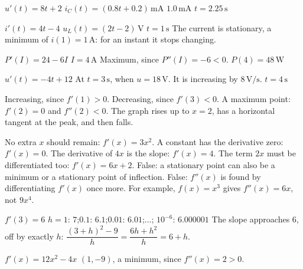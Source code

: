\begin{facit}
  $u'(t) = 8t + 2$  $i_C(t) = (0.8t + 0.2)\,\text{mA}$
 $1.0\,\text{mA}$  $t = 2.25\,\text{s}$

  $i'(t) = 4t - 4$  $u_L(t) = (2t - 2)\,\text{V}$  $t = 1\,\text{s}$
 The current is stationary, a minimum of $i(1) = 1\,\text{A}$: for an instant it stops
changing.

  $P'(I) = 24 - 6I$  $I = 4\,\text{A}$
 Maximum, since $P''(I) = -6 < 0$.  $P(4) = 48\,\text{W}$

  $u'(t) = -4t + 12$  At $t = 3\,\text{s}$, when $u = 18\,\text{V}$.
 It is increasing by $8\,\text{V/s}$.  $t = 4\,\text{s}$

  Increasing, since $f'(1) > 0$.  Decreasing, since $f'(3) < 0$.
 A maximum point: $f'(2) = 0$ and $f''(2) < 0$.
 The graph rises up to $x = 2$, has a horizontal tangent at the peak, and then falls.

  No extra $x$ should remain: $f'(x) = 3x^2$.
 A constant has the derivative zero: $f'(x) = 0$.
 The derivative of $4x$ is the slope: $f'(x) = 4$.
 The term $2x$ must be differentiated too: $f'(x) = 6x + 2$.
 False: a stationary point can also be a minimum or a stationary point of inflection.
 False: $f''(x)$ is found by differentiating $f'(x)$ once more. For example, $f(x) = x^3$
gives $f''(x) = 6x$, not $9x^4$.

  $f'(3) = 6$
 $h = 1$: $7$;\enspace $0.1$: $6.1$;\enspace $0.01$: $6.01$;\enspace $\ldots$;\enspace
$10^{-6}$: $6.000001$
 The slope approaches $6$, off by exactly $h$:
$\dfrac{(3 + h)^2 - 9}{h} = \dfrac{6h + h^2}{h} = 6 + h$.

  $f'(x) = 12x^2 - 4x$
 $(1, -9)$, a minimum, since $f''(x) = 2 > 0$.

\end{facit}
